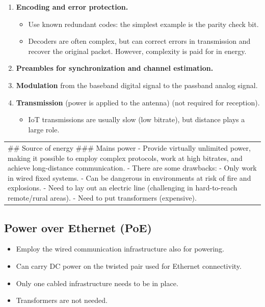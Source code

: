 \documentclass[a4paper, 12pt]{book} %
\begin{document}
\begin{enumerate}
\def\labelenumi{\arabic{enumi}.}
\tightlist
\item
  \textbf{Encoding and error protection.}

  \begin{itemize}
  \tightlist
  \item
    Use known redundant codes: the simplest example is the parity check
    bit.
  \item
    Decoders are often complex, but can correct errors in transmission
    and recover the original packet. However, complexity is paid for in
    energy.
  \end{itemize}
\item
  \textbf{Preambles for synchronization and channel estimation.}
\item
  \textbf{Modulation} from the baseband digital signal to the passband
  analog signal.
\item
  \textbf{Transmission} (power is applied to the antenna) (not required
  for reception).

  \begin{itemize}
  \tightlist
  \item
    IoT transmissions are usually slow (low bitrate), but distance plays
    a large role.
  \end{itemize}
\end{enumerate}

\begin{longtable}[]{@{}
  >{\raggedright\arraybackslash}p{}@{}}
\toprule\noalign{}
\endhead
\bottomrule\noalign{}
\endlastfoot
\#\# Source of energy \#\#\# Mains power - Provide virtually unlimited
power, making it possible to employ complex protocols, work at high
bitrates, and achieve long-distance communication. - There are some
drawbacks: - Only work in wired fixed systems. - Can be dangerous in
environments at risk of fire and explosions. - Need to lay out an
electric line (challenging in hard-to-reach remote/rural areas). - Need
to put transformers (expensive). \\
\end{longtable}

\subsection{Power over Ethernet (PoE)}\label{power-over-ethernet-poe}

\begin{itemize}
\tightlist
\item
  Employ the wired communication infrastructure also for powering.
\item
  Can carry DC power on the twisted pair used for Ethernet connectivity.
\item
  Only one cabled infrastructure needs to be in place.
\item
  Transformers are not needed.
\end{itemize}
\end{document}
